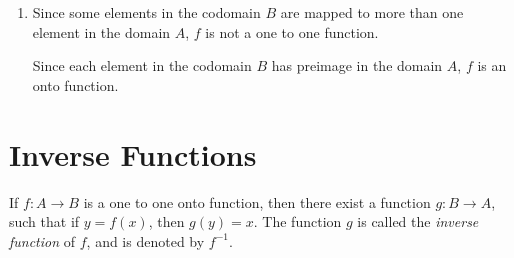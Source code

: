 \documentclass[12pt]{report}
\begin{document}
\begin{enumerate}
\begin{multicols}{2}
\begin{enumerate}
            \item {}
                  \sol{}

                  Since some elements in the codomain $B$ are mapped to more than one element in
                  the domain $A$, $f$ is not a one to one function.

                  Since each element in the codomain $B$ has preimage in the domain $A$, $f$ is
                  an onto function.
          \end{enumerate}
        \end{multicols}
\end{enumerate}

\newpage

\section{Inverse Functions}

\begin{mdframed}[style=MyFrame]
  If $f: A \to B$ is a one to one onto function, then there exist a function $g: B \to A$, such that if $y = f(x)$, then $g(y) = x$. The function $g$ is called the \emph{inverse function} of $f$, and is denoted by $f^{-1}$.
\end{mdframed}
\end{document}

